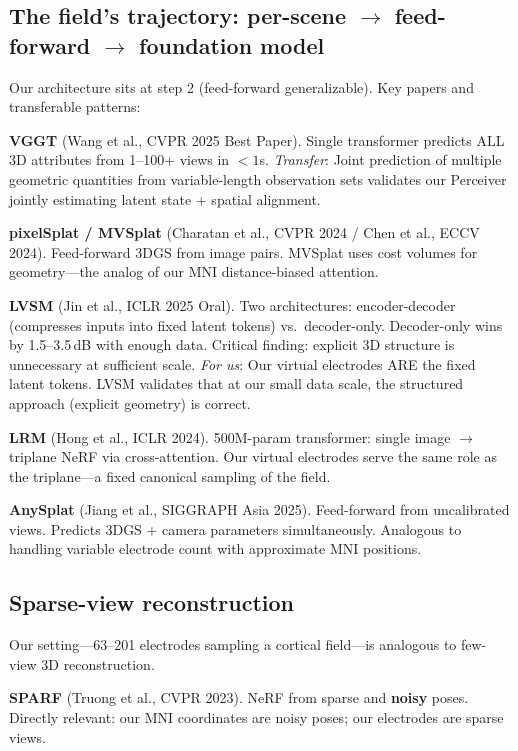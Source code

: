 \documentclass[11pt,letterpaper]{article}
\begin{document}
\subsection{The field's trajectory: per-scene $\to$ feed-forward $\to$ foundation model}

Our architecture sits at step 2 (feed-forward generalizable). Key papers and transferable patterns:

\textbf{VGGT} (Wang et al., CVPR 2025 Best Paper). Single transformer predicts ALL 3D attributes from 1--100+ views in ${<}1$s. \textit{Transfer}: Joint prediction of multiple geometric quantities from variable-length observation sets validates our Perceiver jointly estimating latent state + spatial alignment.

\textbf{pixelSplat / MVSplat} (Charatan et al., CVPR 2024 / Chen et al., ECCV 2024). Feed-forward 3DGS from image pairs. MVSplat uses cost volumes for geometry---the analog of our MNI distance-biased attention.

\textbf{LVSM} (Jin et al., ICLR 2025 Oral). Two architectures: encoder-decoder (compresses inputs into fixed latent tokens) vs.\ decoder-only. Decoder-only wins by 1.5--3.5\,dB with enough data. Critical finding: explicit 3D structure is unnecessary at sufficient scale. \textit{For us}: Our virtual electrodes ARE the fixed latent tokens. LVSM validates that at our small data scale, the structured approach (explicit geometry) is correct.

\textbf{LRM} (Hong et al., ICLR 2024). 500M-param transformer: single image $\to$ triplane NeRF via cross-attention. Our virtual electrodes serve the same role as the triplane---a fixed canonical sampling of the field.

\textbf{AnySplat} (Jiang et al., SIGGRAPH Asia 2025). Feed-forward from uncalibrated views. Predicts 3DGS + camera parameters simultaneously. Analogous to handling variable electrode count with approximate MNI positions.

\subsection{Sparse-view reconstruction}

Our setting---63--201 electrodes sampling a cortical field---is analogous to few-view 3D reconstruction.

\textbf{SPARF} (Truong et al., CVPR 2023). NeRF from sparse and \textbf{noisy} poses. Directly relevant: our MNI coordinates are noisy poses; our electrodes are sparse views.
\end{document}
